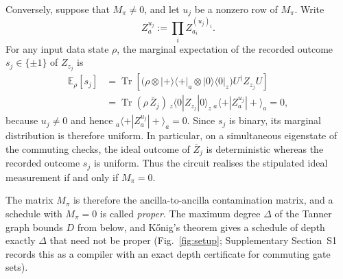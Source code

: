 \documentclass[reprint,twocolumn,superscriptaddress,nofootinbib]{revtex4-2}
\theoremstyle{plain}
\begin{document}
Conversely, suppose that $M_\pi\neq0$, and let $u_j$ be a nonzero row of
$M_\pi$. Write
\[
Z_a^{u_j}:=\prod_i Z_{a_i}^{(u_j)_i}.
\]
For any input data state $\rho$, the marginal expectation of the recorded
outcome $s_j\in\{\pm1\}$ of $Z_{z_j}$ is
\[
\begin{aligned}
\mathbb{E}_{\rho}[s_j]
&=
\operatorname{Tr}\!\left[
  \bigl(\rho\otimes |+\rangle\!\langle+|_a
  \otimes |0\rangle\!\langle0|_z\bigr)
  U^\dagger Z_{z_j}U
\right] \\
&=
\operatorname{Tr}(\rho\,\overline{Z}_j)\,
{}_z\langle0|Z_{z_j}|0\rangle_z\,
{}_a\langle+|Z_a^{u_j}|+\rangle_a
=0,
\end{aligned}
\]
because $u_j\neq0$ and hence
${}_a\langle+|Z_a^{u_j}|+\rangle_a=0$. Since $s_j$ is binary, its marginal
distribution is therefore uniform. In particular, on a simultaneous
eigenstate of the commuting checks, the ideal outcome of
$\overline{Z}_j$ is deterministic whereas the recorded outcome $s_j$ is
uniform. Thus the circuit realises the stipulated ideal measurement if
and only if $M_\pi=0$.

The matrix $M_\pi$ is therefore the ancilla-to-ancilla contamination
matrix, and a schedule with $M_\pi=0$ is called \emph{proper}. The maximum
degree $\Delta$ of the Tanner graph bounds $D$ from below, and
K\H{o}nig's theorem gives a schedule of depth exactly $\Delta$ that need
not be proper (Fig.~\ref{fig:setup}; Supplementary Section~S1 records
this as a compiler with an exact depth certificate for commuting gate
sets).
\end{document}
